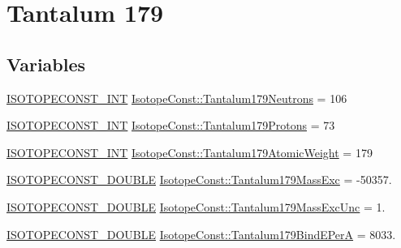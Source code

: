 \hypertarget{group___isotope_const-_tantalum-_ta179}{}\section{Tantalum 179}
\label{group___isotope_const-_tantalum-_ta179}
\subsection*{Variables}
\begin{DoxyCompactItemize}
\item 
\mbox{\hyperlink{group___isotope_const-_macros_ga5f18360b3e99483a35c32d789e62621c}{I\+S\+O\+T\+O\+P\+E\+C\+O\+N\+S\+T\+\_\+\+I\+NT}} \mbox{\hyperlink{group___isotope_const-_tantalum-_ta179_ga784399e1e026fd6213c79d0be01344c0}{Isotope\+Const\+::\+Tantalum179\+Neutrons}} = 106
\item 
\mbox{\hyperlink{group___isotope_const-_macros_ga5f18360b3e99483a35c32d789e62621c}{I\+S\+O\+T\+O\+P\+E\+C\+O\+N\+S\+T\+\_\+\+I\+NT}} \mbox{\hyperlink{group___isotope_const-_tantalum-_ta179_gad62bc2af204b788876c4ee8be1ddddbd}{Isotope\+Const\+::\+Tantalum179\+Protons}} = 73
\item 
\mbox{\hyperlink{group___isotope_const-_macros_ga5f18360b3e99483a35c32d789e62621c}{I\+S\+O\+T\+O\+P\+E\+C\+O\+N\+S\+T\+\_\+\+I\+NT}} \mbox{\hyperlink{group___isotope_const-_tantalum-_ta179_ga215ea7c4e8f2af7261e14c34d87dc3d2}{Isotope\+Const\+::\+Tantalum179\+Atomic\+Weight}} = 179
\item 
\mbox{\hyperlink{group___isotope_const-_macros_ga8f45a7272ce02c0b4c65c44636ed719a}{I\+S\+O\+T\+O\+P\+E\+C\+O\+N\+S\+T\+\_\+\+D\+O\+U\+B\+LE}} \mbox{\hyperlink{group___isotope_const-_tantalum-_ta179_gae363f2f651c43e54fcf92f2360a63470}{Isotope\+Const\+::\+Tantalum179\+Mass\+Exc}} = -\/50357.
\item 
\mbox{\hyperlink{group___isotope_const-_macros_ga8f45a7272ce02c0b4c65c44636ed719a}{I\+S\+O\+T\+O\+P\+E\+C\+O\+N\+S\+T\+\_\+\+D\+O\+U\+B\+LE}} \mbox{\hyperlink{group___isotope_const-_tantalum-_ta179_gace3160ccbbb6bab615f4e600e141ba4b}{Isotope\+Const\+::\+Tantalum179\+Mass\+Exc\+Unc}} = 1.
\item 
\mbox{\hyperlink{group___isotope_const-_macros_ga8f45a7272ce02c0b4c65c44636ed719a}{I\+S\+O\+T\+O\+P\+E\+C\+O\+N\+S\+T\+\_\+\+D\+O\+U\+B\+LE}} \mbox{\hyperlink{group___isotope_const-_tantalum-_ta179_ga50b5359c38f7a123eafeb2bda1c9313d}{Isotope\+Const\+::\+Tantalum179\+Bind\+E\+PerA}} = 8033.
\item 

\end{DoxyCompactItemize}
